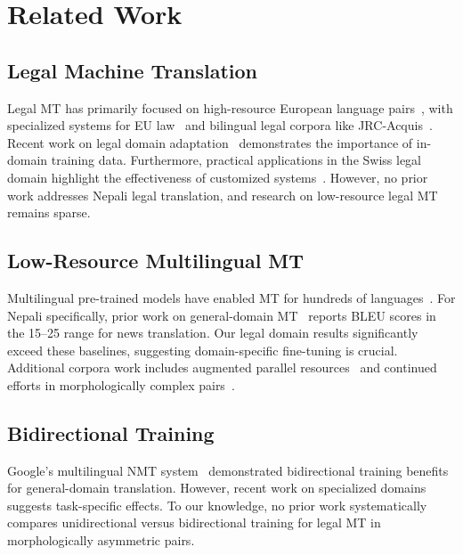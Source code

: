 \documentclass[manuscript, screen, review]{acmart}
\begin{document}
\section{Related Work}
\label{sec:related}

\subsection{Legal Machine Translation}
\label{subsec:legal_mt}

Legal MT has primarily focused on high-resource European language pairs~\cite{koehn2017six}, with specialized systems for EU law~\cite{barreiro2013eur} and bilingual legal corpora like JRC-Acquis~\cite{steinberger2006jrc}. Recent work on legal domain adaptation~\cite{chalkidis2021legal} demonstrates the importance of in-domain training data. Furthermore, practical applications in the Swiss legal domain highlight the effectiveness of customized systems~\cite{martinez2020customized}. However, no prior work addresses Nepali legal translation, and research on low-resource legal MT remains sparse.

\subsection{Low-Resource Multilingual MT}
\label{subsec:low_resource_mt}

Multilingual pre-trained models have enabled MT for hundreds of languages~\cite{liu2020multilingual,nllb2022}. For Nepali specifically, prior work on general-domain MT~\cite{khatri2020nepali, acharya2018comparative} reports BLEU scores in the 15--25 range for news translation. Our legal domain results significantly exceed these baselines, suggesting domain-specific fine-tuning is crucial. Additional corpora work includes augmented parallel resources~\cite{duwal2019efforts} and continued efforts in morphologically complex pairs~\cite{chaudhary2020efforts}.

\subsection{Bidirectional Training}
\label{subsec:bidirectional}

Google's multilingual NMT system~\cite{johnson2017google} demonstrated bidirectional training benefits for general-domain translation. However, recent work on specialized domains~\cite{muller2020domain} suggests task-specific effects. To our knowledge, no prior work systematically compares unidirectional versus bidirectional training for legal MT in morphologically asymmetric pairs.
\end{document}
